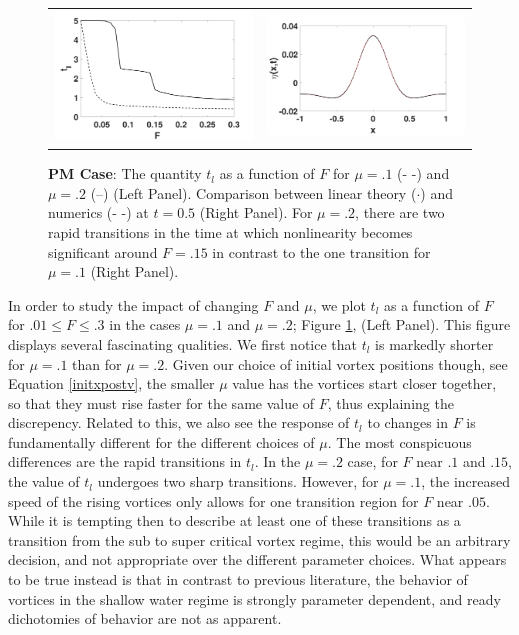 \documentclass[a4paper,11pt]{article}
\begin{document}
%
\begin{figure}[!h]
\centering
\begin{tabular}{cc}
\includegraphics[width=.46\textwidth]{froude_lin}& \includegraphics[width=.5\textwidth]{lin_response_tf_pt5} \\
\end{tabular}
\caption{\small {\bf PM Case}: The quantity $t_{l}$ as a function of $F$  for $\mu=.1$ (- -) and $\mu=.2$ (--) (Left Panel).  Comparison between linear theory ($\cdot$) and numerics (- -) at $t=0.5$  (Right Panel).  For $\mu=.2$, there are two rapid transitions in the time at which nonlinearity becomes significant around $F=.15$ in contrast to the one transition for $\mu=.1$ (Right Panel).}
\label{fig:linrep}
\end{figure}
In order to study the impact of changing $F$ and $\mu$, we plot $t_{l}$ as a function of $F$ for $.01\leq F \leq .3$ in the cases $\mu=.1$ and $\mu=.2$; Figure \ref{fig:linrep}, (Left Panel).  This figure displays several fascinating qualities.  We first notice that $t_{l}$ is markedly shorter for $\mu=.1$ than for $\mu=.2$.  Given our choice of initial vortex positions though, see Equation \eqref{initxpostv}, the smaller $\mu$ value has the vortices start closer together, so that they must rise faster for the same value of $F$, thus explaining the discrepency.  Related to this, we also see the response of $t_{l}$ to changes in $F$ is fundamentally different for the different choices of $\mu$.  The most conspicuous differences are the rapid transitions in $t_{l}$.  In the $\mu=.2$ case, for $F$ near $.1$ and $.15$, the value of $t_{l}$ undergoes two sharp transitions.  However, for $\mu=.1$, the increased speed of the rising vortices only allows for one transition region for $F$ near $.05$.  While it is tempting then to describe at least one of these transitions as a transition from the sub to super critical vortex regime, this would be an arbitrary decision, and not appropriate over the different parameter choices.  What appears to be true instead is that in contrast to previous literature, the behavior of vortices in the shallow water regime is strongly parameter dependent, and ready dichotomies of behavior are not as apparent.  
\end{document}

